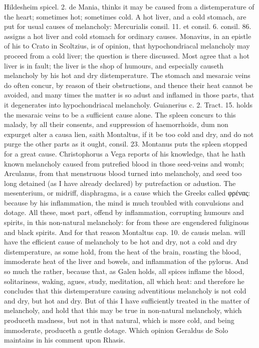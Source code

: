 {\textlatin{Hildesheim spicel. 2. de Mania}, thinks it may be caused from a 
distemperature of the heart; sometimes hot; sometimes cold. A hot
liver, and a cold stomach, are put for usual causes of melancholy:
\textlatin{Mercurialis consil. 11. et consil. 6. consil. 86.} assigns a hot liver
and cold stomach for ordinary causes. Monavius, in an epistle of
his to Crato in Scoltzius, is of opinion, that hypochondriacal
melancholy may proceed from a cold liver; the question is there
discussed. Most agree that a hot liver is in fault; the liver is
the shop of humours, and especially causeth melancholy by his hot and
dry distemperature. The stomach and mesaraic veins do often
concur, by reason of their obstructions, and thence their heat cannot
be avoided, and many times the matter is so adust and inflamed in those
parts, that it degenerates into hypochondriacal melancholy. Guianerius
c. 2. Tract. 15. holds the mesaraic veins to be a sufficient
cause alone. The spleen concurs to this malady, by all their
consents, and suppression of haemorrhoids, dum non expurget alter a
causa lien, saith Montaltus, if it be too cold and dry, and do
not purge the other parts as it ought, consil. 23. Montanus puts the
 spleen stopped for a great cause. Christophorus a Vega
reports of his knowledge, that he hath known melancholy caused from
putrefied blood in those seed-veins and womb; Arculanus, from
that menstruous blood turned into melancholy, and seed too long
detained (as I have already declared) by putrefaction or adustion.
The mesenterium, or midriff, diaphragma, is a cause which the
Greeks called \textgreek{φρένας}: because by his inflammation, the mind is
much troubled with convulsions and dotage. All these, most part, offend
by inflammation, corrupting humours and spirits, in this non-natural
melancholy: for from these are engendered fuliginous and black spirits.
And for that reason \textlatin{Montaltus cap. 10. de causis melan.} will have
the efficient cause of melancholy to be hot and dry, not a cold and dry
distemperature, as some hold, from the heat of the brain, roasting the
blood, immoderate heat of the liver and bowels, and inflammation of the
pylorus. And so much the rather, because that, as Galen holds, all
spices inflame the blood, solitariness, waking, agues, study,
meditation, all which heat: and therefore he concludes that this
distemperature causing adventitious melancholy is not cold and dry, but
hot and dry. But of this I have sufficiently treated in the matter of
melancholy, and hold that this may be true in non-natural melancholy,
which produceth madness, but not in that natural, which is more cold,
and being immoderate, produceth a gentle dotage. Which opinion
Geraldus de Solo maintains in his comment upon Rhasis.

}
